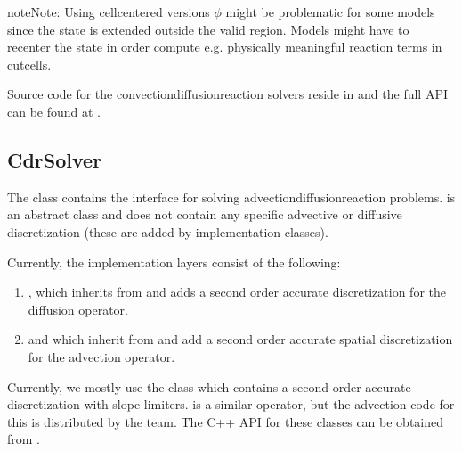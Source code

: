 \documentclass[letterpaper,10pt,english]{sphinxmanual}
\begin{document}
\begin{sphinxadmonition}{note}{Note:}
Using cell\sphinxhyphen{}centered versions \(\phi\) might be problematic for some models since the state is extended outside the valid region.
Models might have to recenter the state in order compute e.g. physically meaningful reaction terms in cut\sphinxhyphen{}cells.
\end{sphinxadmonition}

Source code for the convection\sphinxhyphen{}diffusion\sphinxhyphen{}reaction solvers reside in  and the full API can be found at .


\subsection{CdrSolver}
\label{\detokenize{Solvers/CDR:cdrsolver}}\label{\detokenize{Solvers/CDR:chap-cdrsolver}}
The  class contains the interface for solving advection\sphinxhyphen{}diffusion\sphinxhyphen{}reaction problems.
 is an abstract class and does not contain any specific advective or diffusive discretization (these are added by implementation classes).

Currently, the implementation layers consist of the following:
\begin{enumerate}
%
\item {} 
{\hyperref[\detokenize{Solvers/CDR:chap-cdrmultigrid}]{}}, which inherits from  and adds a second order accurate discretization for the diffusion operator.

\item {} 
{\hyperref[\detokenize{Solvers/CDR:chap-cdrctu}]{}} and {\hyperref[\detokenize{Solvers/CDR:chap-cdrgodunov}]{}} which inherit from  and add a second order accurate spatial discretization for the advection operator.

\end{enumerate}

Currently, we mostly use the  class which contains a second order accurate discretization with slope limiters.
 is a similar operator, but the advection code for this is distributed by the  team.
The C++ API for these classes can be obtained from .
\end{document}
